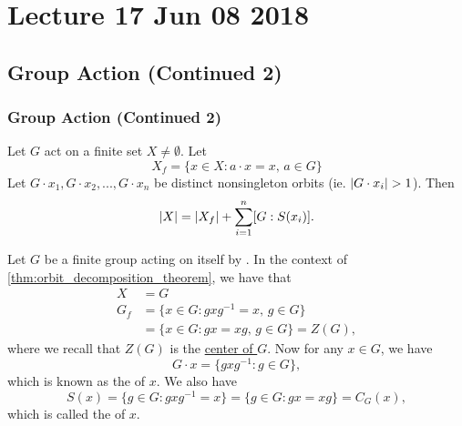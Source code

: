 \chapter{Lecture 17 Jun 08 2018}%
\label{chp:lecture_17_jun_08_2018}

\section{Group Action (Continued 2)}%
\label{sec:group_action_continued_2}

\subsection{Group Action (Continued 2)}%
\label{sub:group_action_continued_2}

\begin{note}
  Let $G$ act on a finite set $X \neq \emptyset$. Let
  \begin{equation*}
    X_f = \{x \in X : a \cdot x = x, \, a \in G \}
  \end{equation*}
  Let $G \cdot x_1, G \cdot x_2, ..., G \cdot x_n$ be distinct nonsingleton orbits (ie. $\left|G \cdot x_i\right| > 1$). Then
  \begin{equation*}
    \left|X\right| = \left|X_f\right| + \sum_{i=1}^{n} [ G : S(x_i) ].
  \end{equation*}
\end{note}

\begin{eg}
  Let $G$ be a finite group acting on itself by . In the context of \cref{thm:orbit_decomposition_theorem}, we have that
  \begin{align*}
    X &= G \\
    G_f &= \{x \in G : gxg^{-1} = x, \, g \in G \} \\
        &= \{x \in G : gx = xg, \, g \in G \} = Z(G),
  \end{align*}
  where we recall that $Z(G)$ is the \hyperref[defn:center_of_a_group]{center of $G$}. Now for any $x \in G$, we have
  \begin{equation*}
    G \cdot x = \{ gxg^{-1} : g \in G \},
  \end{equation*}
  which is known as the  of $x$. We also have
  \begin{equation*}
    S(x) = \{g \in G : gxg^{-1} = x \} = \{g \in G : gx = xg \} = C_G(x),
  \end{equation*}
  which is called the  of $x$.
\end{eg}

